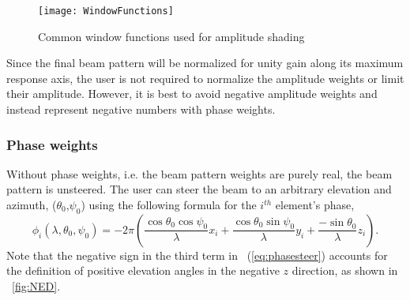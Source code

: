 \begin{figure}[!ht]
\begin{center}
\texttt{[image: WindowFunctions]}
\caption{\label{fig:WindowFunctions}Common window functions used for amplitude shading}
\end{center}
\end{figure}

Since the final beam pattern will be normalized for unity gain along its maximum response axis, the user is not required to normalize the amplitude weights or limit their amplitude. However, it is best to avoid negative amplitude weights and instead represent negative numbers with phase weights.

\subsubsection{Phase weights}

Without phase weights, i.e. the beam pattern weights are purely real, the beam pattern is unsteered. The user can steer the beam to an arbitrary elevation and azimuth, ($\theta_0$,$\psi_0$) using the following formula for the $i^{th}$ element's phase,
\begin{equation}
\phi_i(\lambda,\theta_0,\psi_0) = -2\pi\left(\frac{\cos\theta_0\cos\psi_0}{\lambda}x_i + \frac{\cos\theta_0\sin\psi_0}{\lambda}y_i + \frac{-\sin\theta_0}{\lambda}z_i \right).\label{eq:phasesteer}
\end{equation}
Note that the negative sign in the third term in \eqnname~(\ref{eq:phasesteer}) accounts for the definition of positive elevation angles in the negative $z$ direction, as shown in \figname~\ref{fig:NED}.